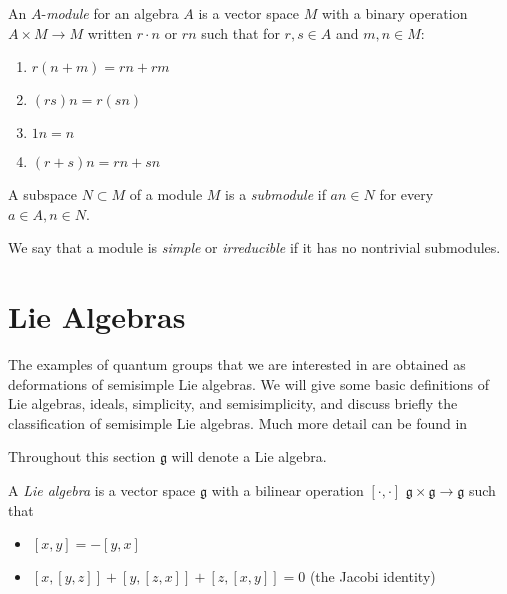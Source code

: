 \begin{defn}
    An $A$-\emph{module} for an algebra $A$ is a vector space $M$ with a binary
    operation $A \times M \to M$ written $r\cdot n$ or $rn$ such that for $r,s \in A$ and $m,n \in M$:

    \begin{enumerate}
        \item $r(n + m) = rn + rm$
        \item $(rs)n = r(sn)$
        \item $1n = n$
        \item $(r+s)n = rn + sn$
    \end{enumerate}
\end{defn}

\begin{defn}
    A subspace $N \subset M$ of a module $M$ is a \emph{submodule} if $an \in N$ for every $a \in A, n\in N$.
\end{defn}

\begin{defn}
    We say that a module is \emph{simple} or \emph{irreducible} if it has no nontrivial submodules.
\end{defn}

\section{Lie Algebras}

The examples of quantum groups that we are interested in are obtained as
deformations of semisimple Lie algebras. We will give some basic definitions of
Lie algebras, ideals, simplicity, and semisimplicity, and discuss briefly the
classification of semisimple Lie algebras. Much more detail can be found in
\cite{Humphreys1973}

Throughout this section $\mathfrak{g}$ will denote a Lie algebra.

A \emph{Lie algebra} is a vector space $\mathfrak{g}$ with a bilinear operation
$\left[ \cdot, \cdot \right]$  $\mathfrak{g} \times \mathfrak{g} \to
\mathfrak{g}$ such that 

\begin{itemize}
    \item $\left[ x,y \right] = -\left[ y,x \right]$
    \item $\left[ x, \left[ y,z \right] \right] + \left[ y, \left[ z,x \right] \right] + \left[ z, \left[ x,y \right] \right] = 0$ (the Jacobi identity)
\end{itemize}

